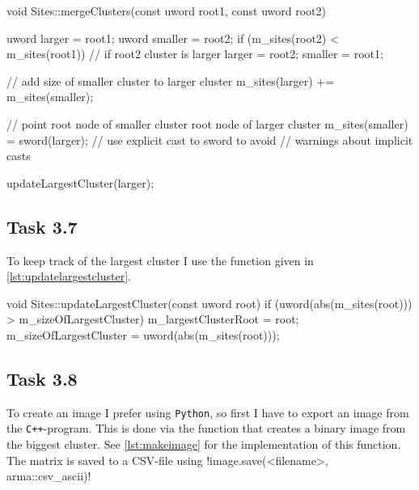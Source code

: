 \documentclass[a4paper]{article}
\newcommand{\cpp}{\texttt{C++}}
\newcommand{\python}{\texttt{Python}}
\begin{document}
\begin{listing}[h!]
\begin{cppcode}
void Sites::mergeClusters(const uword root1, const uword root2)
{
    uword larger = root1;
    uword smaller = root2;
    if (m_sites(root2) < m_sites(root1)) // if root2 cluster is larger
    {
        larger = root2;
        smaller = root1;
    }

    // add size of smaller cluster to larger cluster
    m_sites(larger) += m_sites(smaller);

    // point root node of smaller cluster root node of larger cluster
    m_sites(smaller) = sword(larger); // use explicit cast to sword to avoid
                                      // warnings  about implicit casts

    updateLargestCluster(larger);
}
\end{cppcode}
\caption{%
    Member function of the class  that merges two clusters with root nodes  and . See \cref{lst:updatelargestcluster} for implementation of .%
    \label{lst:mergeclusters}%
}
\end{listing}
\FloatBarrier

\subsection*{Task 3.7}
To keep track of the largest cluster I use the function  given in \cref{lst:updatelargestcluster}.

\begin{listing}[h!]
\begin{cppcode}
void Sites::updateLargestCluster(const uword root)
{
    if (uword(abs(m_sites(root))) > m_sizeOfLargestCluster)
    {
        m_largestClusterRoot = root;
        m_sizeOfLargestCluster = uword(abs(m_sites(root)));
    }
}
\end{cppcode}
\caption{%
    Member function of the class  that updates the size and root node of the largest cluster.  and  are members of  with type .%
    \label{lst:updatelargestcluster}%
}
\end{listing}
\FloatBarrier

\subsection*{Task 3.8}
To create an image I prefer using \python, so first I have to export an image from the \cpp-program. This is done via the function  that creates a binary image from the biggest cluster. See \cref{lst:makeimage} for the implementation of this function. The matrix is saved to a CSV-file using
\cppmint!image.save(<filename>, arma::csv_ascii)!
\begin{listing}[h!]
%
\caption{%
    Member function of the class  that creates a binary image illustrating the largest cluster.%
    \label{lst:makeimage}%
}
\end{listing}
\end{document}
